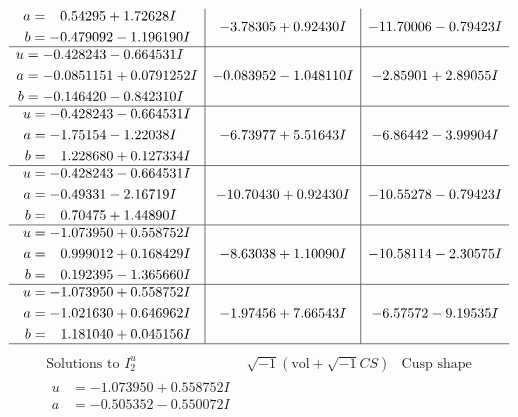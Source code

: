\documentclass[1p]{elsarticle_modified}
\theoremstyle{definition}
\newcommand{\I}{\sqrt{-1}}
\begin{document}
$$\begin{array}{c|c|c}
\begin{aligned}
a &= \phantom{-}0.54295 + 1.72628 I \\
b &= -0.479092 - 1.196190 I\end{aligned}
 & -3.78305 + 0.92430 I & -11.70006 - 0.79423 I \\ \hline\begin{aligned}
u &= -0.428243 - 0.664531 I \\
a &= -0.0851151 + 0.0791252 I \\
b &= -0.146420 - 0.842310 I\end{aligned}
 & -0.083952 - 1.048110 I & -2.85901 + 2.89055 I \\ \hline\begin{aligned}
u &= -0.428243 - 0.664531 I \\
a &= -1.75154 - 1.22038 I \\
b &= \phantom{-}1.228680 + 0.127334 I\end{aligned}
 & -6.73977 + 5.51643 I & -6.86442 - 3.99904 I \\ \hline\begin{aligned}
u &= -0.428243 - 0.664531 I \\
a &= -0.49331 - 2.16719 I \\
b &= \phantom{-}0.70475 + 1.44890 I\end{aligned}
 & -10.70430 + 0.92430 I & -10.55278 - 0.79423 I \\ \hline\begin{aligned}
u &= -1.073950 + 0.558752 I \\
a &= \phantom{-}0.999012 + 0.168429 I \\
b &= \phantom{-}0.192395 - 1.365660 I\end{aligned}
 & -8.63038 + 1.10090 I & -10.58114 - 2.30575 I \\ \hline\begin{aligned}
u &= -1.073950 + 0.558752 I \\
a &= -1.021630 + 0.646962 I \\
b &= \phantom{-}1.181040 + 0.045156 I\end{aligned}
 & -1.97456 + 7.66543 I & -6.57572 - 9.19535 I\\
 \hline 
 \end{array}$$\newpage$$\begin{array}{c|c|c}  
\text{Solutions to }I^u_{2}& \I (\text{vol} + \sqrt{-1}CS) & \text{Cusp shape}\\
 \hline 
\begin{aligned}
u &= -1.073950 + 0.558752 I \\
a &= -0.505352 - 0.550072 I \\

\end{aligned}
\end{array}$$
\end{document}
